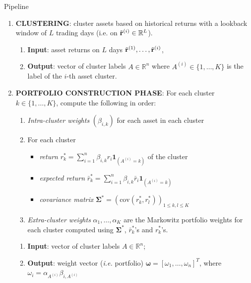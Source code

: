 \documentclass[dvipsnames,mathserif]{beamer}
\newcommand\mypv{\vfill \ifthenelse{\boolean{withPause}}{ \pause }{}}
\begin{document}
\begin{frame}{Pipeline }
\label{general-setting-strat}


    \begin{enumerate}
    \item[(i)] \textbf{CLUSTERING}: 
    cluster assets based on historical returns with a lookback window of $L$ trading days (i.e. on $\Tilde{\mathbf{r}}^{(i)} \in \mathbb{R}^L$).
        \begin{enumerate}
            \item[$\bullet$] \textbf{Input}: asset returns  on $L$ days $\Tilde{\mathbf{r}}^{(1)}, \hdots, \Tilde{\mathbf{r}}^{(i)}$,
            \item[$\bullet$] \textbf{Output}: vector of cluster labels $A \in \mathbb{R}^{n}$ where $A^{(i)} \in \{1, \hdots, K\}$ is the label of the $i$-th asset cluster. 
        \end{enumerate}

\mypv 
    \item[(ii)] \textbf{PORTFOLIO CONSTRUCTION PHASE}: For each cluster $k \in \{1, \ldots, K\}$, compute the following in order:
        \begin{enumerate}
            \item[(a)] \textit{Intra-cluster weights} \((\beta_{i,k})\) for each asset in each cluster
            \item[(b)] For each cluster
            \begin{itemize}
                \item \textit{return} $r^*_k = \sum_{i=1}^n \beta_{i,k} r_i \mathbf{1}_{(A^{(i)}=k)}$ of the cluster
                \item \textit{expected return} $\bar{r}^*_k = \sum_{i=1}^n \beta_{i,k} \bar{r}_i \mathbf{1}_{(A^{(i)}=k)}$
                \item \textit{covariance matrix} $\boldsymbol{\Sigma}^*= (\text{cov}(r^*_k, r^*_l))_{1 \leq k,l \leq K}$
            \end{itemize}
            \item[(c)] \textit{Extra-cluster weights} \(\alpha_1, \ldots, \alpha_K\) are the Markowitz portfolio weights for each cluster computed using $\boldsymbol{\Sigma}^*$, $\bar{r}^*_k$'s and $r^*_k$'s.
        \end{enumerate}
    \begin{enumerate}
        \item[$\bullet$] \textbf{Input}: vector of cluster labels $A \in \mathbb{R}^n$;
        \item[$\bullet$] \textbf{Output}: weight vector (\textit{i.e.} portfolio) $\bm{\omega} = [\omega_1, \hdots, \omega_n]^T$, where $\omega_i =\alpha_{A^{(i)}}\beta_{i, A^{(i)}}$ \\
    \end{enumerate}
    \end{enumerate}

\vfill 

\end{frame}
\end{document}
